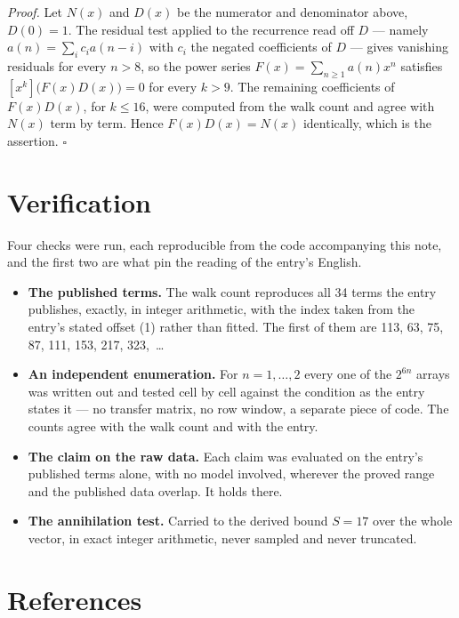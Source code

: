 \documentclass[11pt]{article}
\theoremstyle{definition}
\begin{document}
{\itshape Proof.} Let $N(x)$ and $D(x)$ be the numerator and denominator above, $D(0)=1$. The residual test applied to the recurrence read off $D$ --- namely $a(n) = \sum_i c_i a(n-i)$ with $c_i$ the negated coefficients of $D$ --- gives vanishing residuals for every $n > 8$, so the power series $F(x)=\sum_{n\ge 1}a(n)x^n$ satisfies $[x^k]\bigl(F(x)D(x)\bigr) = 0$ for every $k > 9$. The remaining coefficients of $F(x)D(x)$, for $k \le 16$, were computed from the walk count and agree with $N(x)$ term by term. Hence $F(x)D(x) = N(x)$ identically, which is the assertion. $\square$

\section{Verification}

Four checks were run, each reproducible from the code accompanying this note, and the first two are what pin the reading of the entry's English.

\begin{itemize}

\item {\bfseries The published terms.} The walk count reproduces all 34 terms the entry publishes, exactly, in integer arithmetic, with the index taken from the entry's stated offset (1) rather than fitted. The first of them are 113, 63, 75, 87, 111, 153, 217, 323,~\dots

\item {\bfseries An independent enumeration.} For $n = 1,\dots,2$ every one of the $2^{6n}$ arrays was written out and tested cell by cell against the condition as the entry states it --- no transfer matrix, no row window, a separate piece of code. The counts agree with the walk count and with the entry.

\item {\bfseries The claim on the raw data.} Each claim was evaluated on the entry's published terms alone, with no model involved, wherever the proved range and the published data overlap. It holds there.

\item {\bfseries The annihilation test.} Carried to the derived bound $S = 17$ over the whole vector, in exact integer arithmetic, never sampled and never truncated.

\end{itemize}

\section{References}
\end{document}
